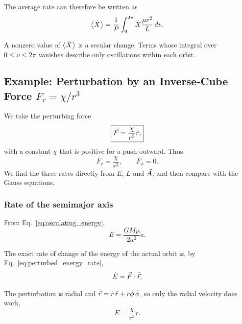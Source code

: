 	The average rate can therefore be written as
	\begin{equation}
		\left\langle \dot X\right\rangle
		=
		\frac{1}{P}
		\int_0^{2\pi}
		\dot X
		\frac{\mu r^2}{L}\,dv .
		\label{eq:average_f}
	\end{equation}
	
	A nonzero value of $\left\langle \dot X\right\rangle$ is a secular change. Terms whose integral over $0\leq v\leq2\pi$ vanishes describe only oscillations within each orbit.
	\subsection{\texorpdfstring{Example: Perturbation by an Inverse-Cube Force $F_r = \chi/r^3$}{Example: Perturbation by an Inverse-Cube Force}}
	
	We take the perturbing force
	\begin{equation}
		\boxed{
			\vec F
			=
			\frac{\chi}{r^3}\hat r ,
		}
		\label{eq:worked_force}
	\end{equation}
	with a constant $\chi$ that is positive for a push outward. Thus
	\begin{equation}
		F_r=\frac{\chi}{r^3},
		\qquad
		F_{\phi}=0.
	\end{equation}
	We find the three rates directly from $E$, $L$ and $\vec A$, and then compare with the Gauss equations.
	
	\subsubsection{Rate of the semimajor axis}
	
	From Eq.~\eqref{eq:osculating_energy},
	\begin{equation}
		\dot E
		=
		\frac{GM\mu}{2a^2}\dot a.
		\label{eq:energy_a}
	\end{equation}
	
	The exact rate of change of the energy of the actual orbit is, by Eq.~\eqref{eq:perturbed_energy_rate},
	\begin{equation}
		\dot E
		=
		\vec F\cdot\dot{\vec r}.
		\label{eq:energy_rate}
	\end{equation}
	
	The perturbation is radial and $\dot{\vec r}=\dot r\,\hat r+r\dot\phi\,\hat\phi$, so only the radial velocity does work,
	\begin{equation}
		\dot E
		=
		\frac{\chi}{r^3}\dot r.
		\label{eq:energy_radial}
	\end{equation}
	
